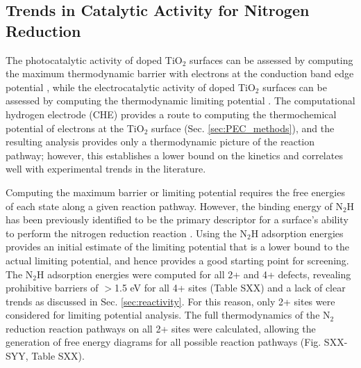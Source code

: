 \subsection{Trends in Catalytic Activity for Nitrogen Reduction}
\label{sec:cat_trends}
The photocatalytic activity of doped TiO$_2$ surfaces can be assessed by computing the maximum thermodynamic barrier with electrons at the conduction band edge potential \cite{Comer_2018}, while the electrocatalytic activity of doped TiO$_2$ surfaces can be assessed by computing the thermodynamic limiting potential \cite{Norskov_2004,Garc_a_Mota_2011}. The computational hydrogen electrode (CHE) provides a route to computing the thermochemical potential of electrons at the TiO$_2$ surface (Sec. \ref{sec:PEC_methods}), and the resulting analysis provides only a thermodynamic picture of the reaction pathway; however, this establishes a lower bound on the kinetics and correlates well with experimental trends in the literature\cite{Seh_2017}.

Computing the maximum barrier or limiting potential requires the free energies of each state along a given reaction pathway. However, the binding energy of N$_2$H has been previously identified to be the primary descriptor for a surface's ability to perform the nitrogen reduction reaction \cite{Hoskuldsson_2017, Montoya_2015}. Using the N$_2$H adsorption energies provides an initial estimate of the limiting potential that is a lower bound to the actual limiting potential, and hence provides a good starting point for screening. The N$_2$H adsorption energies were computed for all 2+ and 4+ defects, revealing prohibitive barriers of $>$1.5 eV for all 4+ sites (Table SXX) and a lack of clear trends as discussed in Sec. \ref{sec:reactivity}. For this reason, only 2+ sites were considered for limiting potential analysis. %
The full thermodynamics of the N$_2$ reduction reaction pathways on all 2+ sites were calculated, allowing the generation of free energy diagrams for all possible reaction pathways (Fig. SXX-SYY, Table SXX). 
 





